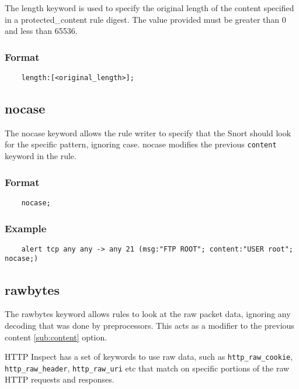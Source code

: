 \documentclass[english]{report}
\begin{document}
The length keyword is used to specify the original length of the content specified in a protected\_content rule digest. The value provided must be greater than 0 and less than 65536.

\subsubsection{Format}

\begin{verbatim}
    length:[<original_length>];
\end{verbatim}

\subsection{nocase}
\label{sub:nocase}

The nocase keyword allows the rule writer to specify that the Snort should look
for the specific pattern, ignoring case.  nocase modifies the previous
\texttt{content} keyword in the rule.

\subsubsection{Format}

\begin{verbatim}
    nocase;
\end{verbatim}

\subsubsection{Example}

\begin{verbatim}
    alert tcp any any -> any 21 (msg:"FTP ROOT"; content:"USER root"; nocase;)
\end{verbatim}

\subsection{rawbytes}
\label{sub:rawbytes}

The rawbytes keyword allows rules to look at the raw packet data, ignoring any
decoding that was done by preprocessors.  This acts as a modifier to the
previous content \ref{sub:content} option.

HTTP Inspect has a set of keywords to use raw data, such as 
\texttt{http\_raw\_cookie}, \texttt{http\_raw\_header}, \texttt{http\_raw\_uri} etc
that match on specific portions of the raw HTTP requests and responses.
\end{document}
